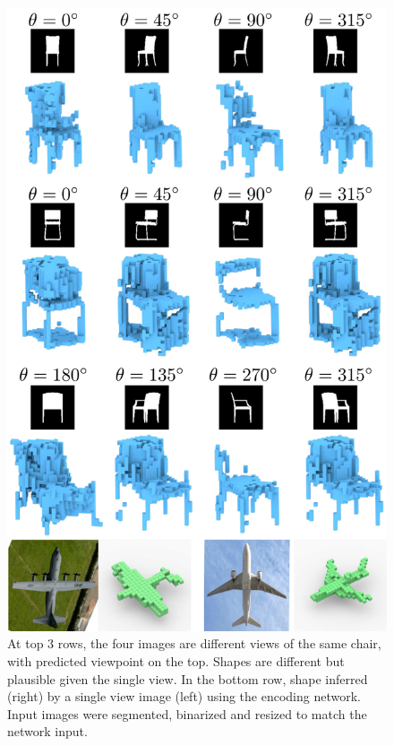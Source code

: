 \begin{figure}[t]
	\centering
	\includegraphics[width=0.85\linewidth]{prgan/fig/shapepred.pdf}
	\caption{\small \label{fig:sp} 
	At top 3 rows, the four images are different views of the same chair, with predicted viewpoint on the top. 
	Shapes are different but plausible given the single view.
	In the bottom row, shape inferred (right) by a single view image (left) using the encoding network. 
	Input images were segmented, binarized and resized to match the network input.}
\end{figure}




